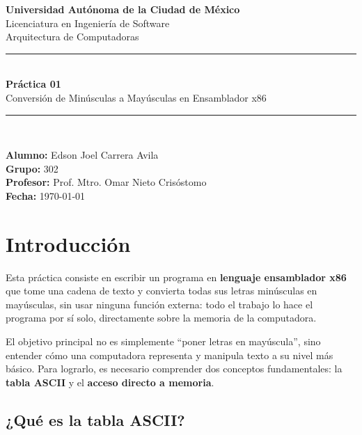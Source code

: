 \documentclass[12pt, letterpaper]{article}
\begin{document}
\begin{titlepage}
    \centering
    \vspace*{1.5cm}

    {\Large \textbf{Universidad Autónoma de la Ciudad de México}}\\[0.3cm]
    {\large Licenciatura en Ingeniería de Software}\\[0.2cm]
    {\large Arquitectura de Computadoras}\\[2.5cm]

    \rule{\linewidth}{0.5pt}\\[0.4cm]
    {\LARGE \bfseries Práctica 01}\\[0.3cm]
    {\Large Conversión de Minúsculas a Mayúsculas en Ensamblador x86}\\[0.3cm]
    \rule{\linewidth}{0.5pt}\\[2cm]

    \begin{flushleft}
        \textbf{Alumno:} Edson Joel Carrera Avila \\[0.3cm]
        \textbf{Grupo:} 302 \\[0.3cm]
        \textbf{Profesor:} Prof. Mtro. Omar Nieto Crisóstomo \\[0.3cm]
        \textbf{Fecha:} \today
    \end{flushleft}
    \vfill
\end{titlepage}

\tableofcontents
\newpage

\section{Introducción}

Esta práctica consiste en escribir un programa en \textbf{lenguaje ensamblador x86} que tome una cadena de texto y convierta todas sus letras minúsculas en mayúsculas, sin usar ninguna función externa: todo el trabajo lo hace el programa por sí solo, directamente sobre la memoria de la computadora.

El objetivo principal no es simplemente ``poner letras en mayúscula'', sino entender cómo una computadora representa y manipula texto a su nivel más básico. Para lograrlo, es necesario comprender dos conceptos fundamentales: la \textbf{tabla ASCII} y el \textbf{acceso directo a memoria}.

\subsection*{¿Qué es la tabla ASCII?}
\end{document}
